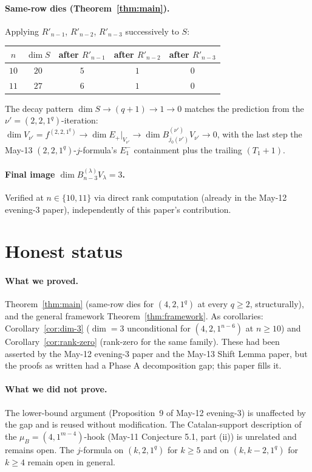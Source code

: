 \documentclass[11pt]{article}
\theoremstyle{definition}
\begin{document}
\paragraph{Same-row dies (Theorem~\ref{thm:main}).} Applying
$R'_{n-1}$, $R'_{n-2}$, $R'_{n-3}$ successively to $S$:
\begin{center}
\begin{tabular}{ccccc}
\toprule
$n$ & $\dim S$ & after $R'_{n-1}$ & after $R'_{n-2}$ & after $R'_{n-3}$\\
\midrule
$10$ & $20$ & $5$ & $1$ & $0$ \\
$11$ & $27$ & $6$ & $1$ & $0$ \\
\bottomrule
\end{tabular}
\end{center}
The decay pattern $\dim S \to (q+1) \to 1 \to 0$ matches the
prediction from the $\nu' = (2, 2, 1^q)$-iteration:
$\dim V_{\nu'} = f^{(2, 2, 1^q)} \to \dim E_+|_{V_{\nu'}} \to
\dim B^{(\nu')}_{j_0(\nu')} V_{\nu'} \to 0$, with the last step
the May-13 $(2, 2, 1^q)$-$j$-formula's $E_1^-$ containment plus the
trailing $(T_1+1)$.

\paragraph{Final image $\dim B^{(\lambda)}_{n-3} V_\lambda = 3$.}
Verified at $n \in \{10, 11\}$ via direct rank computation (already in
the May-12 evening-3 paper), independently of this paper's
contribution.

\section{Honest status}\label{sec:status}

\paragraph{What we proved.} Theorem~\ref{thm:main} (same-row dies for
$(4, 2, 1^q)$ at every $q \ge 2$, structurally), and the general
framework Theorem~\ref{thm:framework}. As corollaries:
Corollary~\ref{cor:dim-3} ($\dim = 3$ unconditional for
$(4, 2, 1^{n-6})$ at $n \ge 10$) and Corollary~\ref{cor:rank-zero}
(rank-zero for the same family). These had been asserted by the
May-12 evening-3 paper and the May-13 Shift Lemma paper, but the
proofs as written had a Phase A decomposition gap; this paper fills
it.

\paragraph{What we did not prove.} The lower-bound argument
(Proposition~9 of May-12 evening-3) is unaffected by the gap and is
reused without modification. The Catalan-support description of the
$\mu_B = (4, 1^{m-4})$-hook (May-11 Conjecture 5.1, part (ii)) is
unrelated and remains open. The $j$-formula on $(k, 2, 1^q)$ for
$k \ge 5$ and on $(k, k-2, 1^q)$ for $k \ge 4$ remain open in general.
\end{document}
